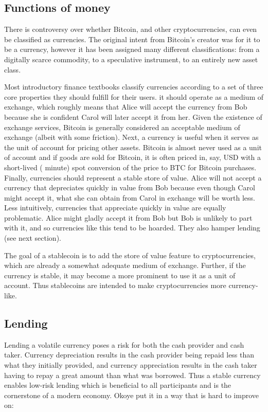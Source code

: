 \subsection{Functions of money}
\label{sec:fofm}

There is controversy over whether Bitcoin, and other cryptocurrencies, can even be classified as currencies. The original intent from Bitcoin's creator was for it to be a currency, however it has been assigned many different classifications: from a digitally scarce commodity, to a speculative instrument, to an entirely new asset class.

Most introductory finance textbooks classify currencies according to a set of three core properties they should fulfill for their users. it should operate as a medium of exchange, which roughly means that Alice will accept the currency from Bob because she is confident Carol will later accept it from her. Given the existence of exchange services, Bitcoin is generally considered an acceptable medium of exchange (albeit with some friction). Next, a currency is useful when it serves as the unit of account for pricing other assets. Bitcoin is almost never used as a unit of account and if goods are sold for Bitcoin, it is often priced in, say, USD with a short-lived ( minute) spot conversion of the price to BTC for Bitcoin purchases. Finally, currencies should represent a stable store of value. Alice will not accept a currency that depreciates quickly in value from Bob because even though Carol might accept it, what she can obtain from Carol in exchange will be worth less. Less intuitively, currencies that appreciate quickly in value are equally problematic. Alice might gladly accept it from Bob but Bob is unlikely to part with it, and so currencies like this tend to be hoarded. They also hamper lending (see next section).

The goal of a stablecoin is to add the store of value feature to cryptocurrencies, which are already a somewhat adequate medium of exchange. Further, if the currency is stable, it may become a more prominent to use it as a unit of account. Thus stablecoins are intended to make cryptocurrencies more currency-like.

\subsection{Lending}

Lending a volatile currency poses a risk for both the cash provider and cash taker. Currency depreciation results in the cash provider being repaid less than what they initially provided, and currency appreciation results in the cash taker having to repay a great amount than what was borrowed. Thus a stable currency enables low-risk lending which is beneficial to all participants and is the cornerstone of a modern economy. Okoye \etal put it in a way that is hard to improve on:

